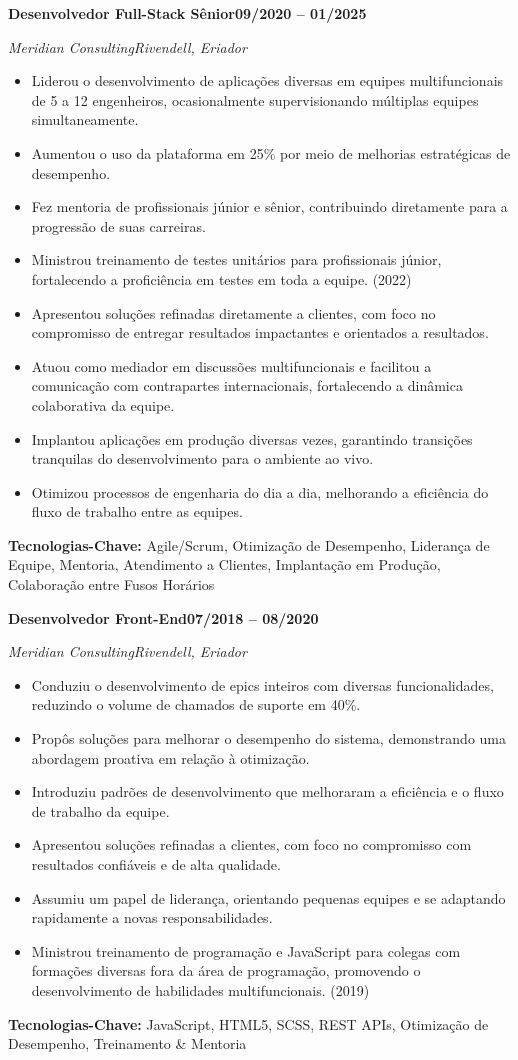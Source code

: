 \documentclass[letterpaper,11pt]{article}
\newlength{\cventrysep}\setlength{\cventrysep}{6pt}  %
\newcommand{\cventry}[4]{%
  \noindent\normalsize\textbf{#1}\hfill\small\textbf{#4}\par
  \nopagebreak[4]
  \noindent\normalsize\textit{\textcolor{accent}{#2}}\hfill\small\textit{#3}\par
  \nopagebreak[4]
}
\newcommand{\keytech}[1]{\small\textbf{Tecnologias-Chave:} #1\par}
\begin{document}
\cventry{Desenvolvedor Full-Stack Sênior}{Meridian Consulting}{Rivendell, Eriador}{09/2020 -- 01/2025}
\begin{itemize}\small
    \item Liderou o desenvolvimento de aplicações diversas em equipes multifuncionais de 5 a 12 engenheiros, ocasionalmente supervisionando múltiplas equipes simultaneamente.
    \item Aumentou o uso da plataforma em 25\% por meio de melhorias estratégicas de desempenho.
    \item Fez mentoria de profissionais júnior e sênior, contribuindo diretamente para a progressão de suas carreiras.
    \item Ministrou treinamento de testes unitários para profissionais júnior, fortalecendo a proficiência em testes em toda a equipe. (2022)
    \item Apresentou soluções refinadas diretamente a clientes, com foco no compromisso de entregar resultados impactantes e orientados a resultados.
    \item Atuou como mediador em discussões multifuncionais e facilitou a comunicação com contrapartes internacionais, fortalecendo a dinâmica colaborativa da equipe.
    \item Implantou aplicações em produção diversas vezes, garantindo transições tranquilas do desenvolvimento para o ambiente ao vivo.
    \item Otimizou processos de engenharia do dia a dia, melhorando a eficiência do fluxo de trabalho entre as equipes.
\end{itemize}
\keytech{Agile/Scrum, Otimização de Desempenho, Liderança de Equipe, Mentoria, Atendimento a Clientes, Implantação em Produção, Colaboração entre Fusos Horários}

\vspace{\cventrysep}

\cventry{Desenvolvedor Front-End}{Meridian Consulting}{Rivendell, Eriador}{07/2018 -- 08/2020}
\begin{itemize}\small
    \item Conduziu o desenvolvimento de epics inteiros com diversas funcionalidades, reduzindo o volume de chamados de suporte em 40\%.
    \item Propôs soluções para melhorar o desempenho do sistema, demonstrando uma abordagem proativa em relação à otimização.
    \item Introduziu padrões de desenvolvimento que melhoraram a eficiência e o fluxo de trabalho da equipe.
    \item Apresentou soluções refinadas a clientes, com foco no compromisso com resultados confiáveis e de alta qualidade.
    \item Assumiu um papel de liderança, orientando pequenas equipes e se adaptando rapidamente a novas responsabilidades.
    \item Ministrou treinamento de programação e JavaScript para colegas com formações diversas fora da área de programação, promovendo o desenvolvimento de habilidades multifuncionais. (2019)
\end{itemize}
\keytech{JavaScript, HTML5, SCSS, REST APIs, Otimização de Desempenho, Treinamento \& Mentoria}
\end{document}
